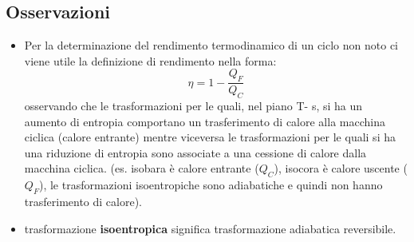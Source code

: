 \subsection{Osservazioni}
\begin{itemize}
    \item Per la determinazione del rendimento termodinamico di un ciclo non noto ci viene utile la definizione di rendimento nella forma:
    \[
        \eta = 1- \frac{Q_F}{Q_C}
    \]
    osservando che le trasformazioni per le quali, nel piano T- s, si ha un aumento di entropia
    comportano un trasferimento di calore alla macchina ciclica (calore entrante) mentre
    viceversa le trasformazioni per le quali si ha una riduzione di entropia sono associate a una
    cessione di calore dalla macchina ciclica. (es. isobara è calore entrante ($Q_C$), isocora è calore uscente ($Q_F$), le trasformazioni isoentropiche sono adiabatiche e quindi non hanno trasferimento di calore).
    \item  trasformazione \textbf{isoentropica} significa trasformazione adiabatica reversibile.
\end{itemize}